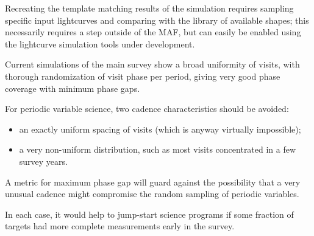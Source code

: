 Recreating the template matching results of the
\citet{2012AJ....144....9O} simulation requires sampling specific input
lightcurves and comparing with the library of available shapes; this
necessarily requires a step outside of the MAF, but can easily be
enabled using the lightcurve simulation tools under development.

Current simulations of the main survey show a broad uniformity of
visits, with thorough randomization of visit phase per period, giving
very good phase coverage with minimum phase gaps.


%

For periodic variable science, two cadence characteristics should be avoided:
\begin{itemize}
\item an exactly uniform spacing of visits (which is anyway virtually impossible); \
\item a very non-uniform distribution, such as most visits concentrated in a few survey years.
 \end{itemize}

A metric for maximum phase gap will guard against the possibility that a
very unusual cadence might compromise the random sampling of periodic
variables.

In each case, it would help to jump-start science programs if some
fraction of targets had more complete measurements early in the survey.

